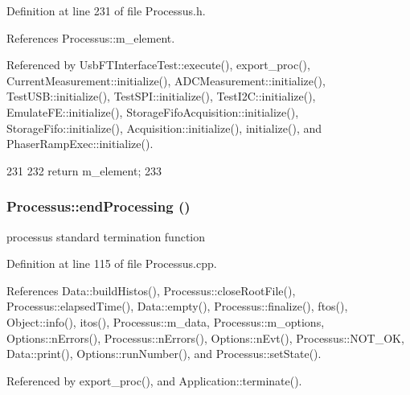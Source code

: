 Definition at line 231 of file Processus.h.

References Processus::m\_\-element.

Referenced by UsbFTInterfaceTest::execute(), export\_\-proc(), CurrentMeasurement::initialize(), ADCMeasurement::initialize(), TestUSB::initialize(), TestSPI::initialize(), TestI2C::initialize(), EmulateFE::initialize(), StorageFifoAcquisition::initialize(), StorageFifo::initialize(), Acquisition::initialize(), initialize(), and PhaserRampExec::initialize().


\begin{DoxyCode}
231                       {
232     return m_element;
233   }
\end{DoxyCode}
\hypertarget{classProcessus_a5e4da662989d356b89d490b89c7afbfd}{
\subsubsection[{endProcessing}]{ Processus::endProcessing ()}}
\label{classProcessus_a5e4da662989d356b89d490b89c7afbfd}
processus standard termination function 

Definition at line 115 of file Processus.cpp.

References Data::buildHistos(), Processus::closeRootFile(), Processus::elapsedTime(), Data::empty(), Processus::finalize(), ftos(), Object::info(), itos(), Processus::m\_\-data, Processus::m\_\-options, Options::nErrors(), Processus::nErrors(), Options::nEvt(), Processus::NOT\_\-OK, Data::print(), Options::runNumber(), and Processus::setState().

Referenced by export\_\-proc(), and Application::terminate().


